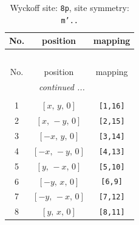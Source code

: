 \documentclass[fleqn,8pt]{jsarticle}
\begin{document}
\renewcommand{\arraystretch}{1.2}
\begin{longtable}{ccc}
\caption{Wyckoff site: {\tt 8p}, site symmetry: {\tt m'..}}
 \\
 \hline \hline
No. & position & mapping \\ \hline \endfirsthead

\multicolumn{2}{l}{\tablename\ \thetable{}} \\
 \hline \hline
No. & position & mapping \\ \hline \endhead

 \hline \hline
\multicolumn{2}{r}{\footnotesize\it continued ...} \\ \endfoot

 \hline \hline
\multicolumn{2}{r}{} \\ \endlastfoot

1 & $\left[ x,\, y,\, 0 \right]$ & {\tt [1,16]} \\ \hline
2 & $\left[ x,\, - y,\, 0 \right]$ & {\tt [2,15]} \\ \hline
3 & $\left[ - x,\, y,\, 0 \right]$ & {\tt [3,14]} \\ \hline
4 & $\left[ - x,\, - y,\, 0 \right]$ & {\tt [4,13]} \\ \hline
5 & $\left[ y,\, - x,\, 0 \right]$ & {\tt [5,10]} \\ \hline
6 & $\left[ - y,\, x,\, 0 \right]$ & {\tt [6,9]} \\ \hline
7 & $\left[ - y,\, - x,\, 0 \right]$ & {\tt [7,12]} \\ \hline
8 & $\left[ y,\, x,\, 0 \right]$ & {\tt [8,11]} \\
\end{longtable}
\renewcommand{\arraystretch}{1.2}
\end{document}
